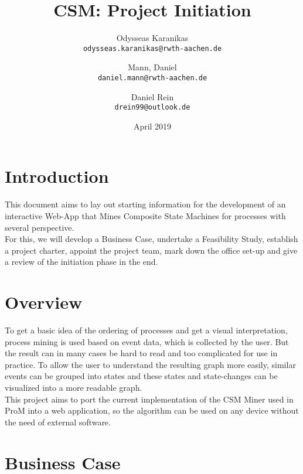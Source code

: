 \documentclass[12pt]{extarticle}
\title{CSM: Project Initiation}
\author{
Odysseas Karanikas\\
\texttt{odysseas.karanikas@rwth-aachen.de}
\and
Mann, Daniel\\
\texttt{daniel.mann@rwth-aachen.de}
\and
Daniel Rein\\
\texttt{drein99@outlook.de}
}
\date{April 2019}
\begin{document}
\maketitle

\section{Introduction}

This document aims to lay out starting information for the development of an interactive Web-App that Mines Composite State Machines for processes with several perspective.\\
For this, we will develop a Business Case, undertake a Feasibility Study, establish a project charter, appoint the project team, mark down the office set-up and give a review of the initiation phase in the end.

\section{Overview}
To get a basic idea of the ordering of processes and get a visual interpretation, process mining is used based on event data, which is collected by the user. But the result can in many cases be hard to read and too complicated for use in practice. To allow the user to understand the resulting graph more easily, similar events can be grouped into states and these states and state-changes can be visualized into a more readable graph. \\ This project aims to port the current implementation of the CSM Miner used in ProM into a web application, so the algorithm can be used on any device without the need of external software.

\section{Business Case}
\end{document}
